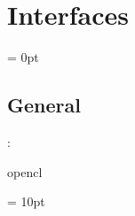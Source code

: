 
\section{Interfaces} 


\parskip = 0pt

\vspace{3mm} \subsection*{General}

: 

opencl
\vspace{2mm}

\vspace{5mm}\parskip = 10pt 
